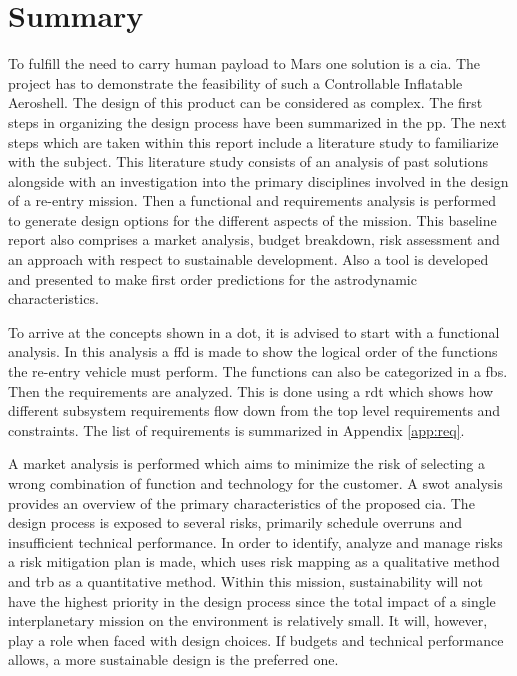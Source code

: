 \section*{Summary}\label{cha:summary}

To fulfill the need to carry human payload to Mars one solution is a \acrfull{cia}. The project has to demonstrate the feasibility of such a Controllable Inflatable Aeroshell. The design of this product can be considered as complex. The first steps in organizing the design process have been summarized in the \acrfull{pp}. The next steps which are taken within this report include a literature study to familiarize with the subject. This literature study consists of an analysis of past solutions alongside with an investigation into the primary disciplines involved in the design of a re-entry mission. Then a functional and requirements analysis is performed to generate design options for the different aspects of the mission. This baseline report also comprises a market analysis, budget breakdown, risk assessment and an approach with respect to sustainable development. Also a tool is developed and presented to make first order predictions for the astrodynamic characteristics. 

To arrive at the concepts shown in a \acrfull{dot}, it is advised to start with a functional analysis. In this analysis a \acrfull{ffd} is made to show the logical order of the functions the re-entry vehicle must perform. The functions can also be categorized in a \acrfull{fbs}. Then the requirements are analyzed. This is done using a \gls{rdt} which shows how different subsystem requirements flow down from the top level requirements and constraints. The list of requirements is summarized in Appendix \ref{app:req}.

A market analysis is performed which aims to minimize the risk of selecting a wrong combination of function and technology for the customer. A \acrfull{swot} analysis provides an overview of the primary characteristics of the proposed \gls{cia}. The design process is exposed to several risks, primarily schedule overruns and insufficient technical performance. In order to identify, analyze and manage risks a risk mitigation plan is made, which uses risk mapping as a qualitative method and \gls{trb} as a quantitative method. Within this mission, sustainability will not have the highest priority in the design process since the total impact of a single interplanetary mission on the environment is relatively small. It will, however, play a role when faced with design choices. If budgets and technical performance allows, a more sustainable design is the preferred one.

